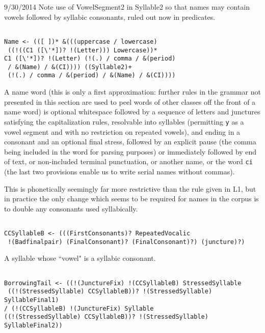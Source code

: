 \documentclass[12pt]{article}
\begin{document}
9/30/2014  Note use of VowelSegment2 in Syllable2 so that names may contain vowels followed by syllabic consonants, ruled out now in predicates.

\begin{verbatim}

Name <- (([ ])* &(((uppercase / lowercase)
 ((!((C1 ([\'*])? !(Letter))) Lowercase))* 
C1 ([\'*])? !(Letter) (!(.) / comma / &(period)
 / &(Name) / &(CI)))) ((Syllable2)+
 (!(.) / comma / &(period) / &(Name) / &(CI))))

\end{verbatim}

A name word (this is only a first approximation:  further rules in the grammar not presented in this section are used to peel words of other classes
off the front of a name word) is optional whitespace followed by a sequence of letters and junctures satisfying the capitalization rules,  resolvable into syllables (permitting
{\tt y} as a vowel segment and with no restriction on repeated vowels), and ending in a consonant and an optional final stress, followed by an explicit pause (the comma being included in the word for parsing purposes) or immediately followed
by end of text, or non-included terminal punctuation, or another name, or the word {\tt ci} (the last two provisions enable us to write serial names without commas).

This is phonetically seemingly far more restrictive than the rule given in L1, but in practice the only change which seems to be required for names in the corpus is to double any consonants used syllabically.

\begin{verbatim}

CCSyllableB <- (((FirstConsonants)? RepeatedVocalic
 !(Badfinalpair) (FinalConsonant)? (FinalConsonant)?) (juncture)?)

\end{verbatim}

A syllable whose ``vowel" is a syllabic consonant.

\begin{verbatim}

BorrowingTail <- ((!(JunctureFix) !(CCSyllableB) StressedSyllable
 ((!(StressedSyllable) CCSyllableB))? !(StressedSyllable) SyllableFinal1) 
/ (!(CCSyllableB) !(JunctureFix) Syllable 
((!(StressedSyllable) CCSyllableB))? !(StressedSyllable) SyllableFinal2))

\end{verbatim}
\end{document}
